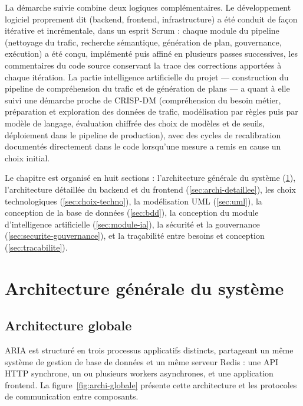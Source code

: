 La démarche suivie combine deux logiques complémentaires. Le développement logiciel proprement dit (backend, frontend, infrastructure) a été conduit de façon itérative et incrémentale, dans un esprit Scrum : chaque module du pipeline (nettoyage du trafic, recherche sémantique, génération de plan, gouvernance, exécution) a été conçu, implémenté puis affiné en plusieurs passes successives, les commentaires du code source conservant la trace des corrections apportées à chaque itération. La partie intelligence artificielle du projet — construction du pipeline de compréhension du trafic et de génération de plans — a quant à elle suivi une démarche proche de CRISP-DM (compréhension du besoin métier, préparation et exploration des données de trafic, modélisation par règles puis par modèle de langage, évaluation chiffrée des choix de modèles et de seuils, déploiement dans le pipeline de production), avec des cycles de recalibration documentés directement dans le code lorsqu'une mesure a remis en cause un choix initial.

Le chapitre est organisé en huit sections : l'architecture générale du système (\ref{sec:archi-generale}), l'architecture détaillée du backend et du frontend (\ref{sec:archi-detaillee}), les choix technologiques (\ref{sec:choix-techno}), la modélisation UML (\ref{sec:uml}), la conception de la base de données (\ref{sec:bdd}), la conception du module d'intelligence artificielle (\ref{sec:module-ia}), la sécurité et la gouvernance (\ref{sec:securite-gouvernance}), et la traçabilité entre besoins et conception (\ref{sec:tracabilite}).

\section{Architecture générale du système}
\label{sec:archi-generale}

\subsection{Architecture globale}

ARIA est structuré en trois processus applicatifs distincts, partageant un même système de gestion de base de données et un même serveur Redis : une API HTTP synchrone, un ou plusieurs workers asynchrones, et une application frontend. La figure~\ref{fig:archi-globale} présente cette architecture et les protocoles de communication entre composants.

